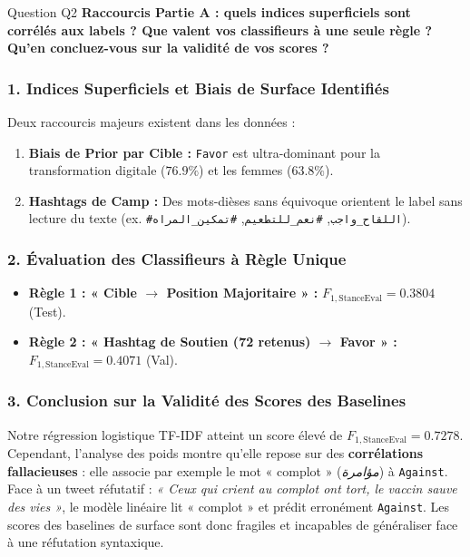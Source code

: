 \documentclass[11pt,a4paper]{article}
\begin{document}
\vspace{0.3cm}

\begin{questionbox}{Question Q2}
\textbf{Raccourcis Partie A : quels indices superficiels sont corrélés aux labels ? Que valent vos classifieurs à une seule règle ? Qu'en concluez-vous sur la validité de vos scores ?}
\end{questionbox}

\subsubsection*{1. Indices Superficiels et Biais de Surface Identifiés}
Deux raccourcis majeurs existent dans les données :
\begin{enumerate}[noitemsep]
    \item \textbf{Biais de Prior par Cible :} \texttt{Favor} est ultra-dominant pour la transformation digitale ($76.9\%$) et les femmes ($63.8\%$).
    \item \textbf{Hashtags de Camp :} Des mots-dièses sans équivoque orientent le label sans lecture du texte (ex. \texttt{\#اللقاح\_واجب}, \texttt{\#نعم\_للتطعيم}, \texttt{\#تمكين\_المراه}).
\end{enumerate}

\subsubsection*{2. Évaluation des Classifieurs à Règle Unique}
\begin{itemize}[noitemsep]
    \item \textbf{Règle 1 : « Cible $\to$ Position Majoritaire » :} $F_{1,\text{StanceEval}} = \mathbf{0.3804}$ (Test).
    \item \textbf{Règle 2 : « Hashtag de Soutien (72 retenus) $\to$ Favor » :} $F_{1,\text{StanceEval}} = \mathbf{0.4071}$ (Val).
\end{itemize}

\subsubsection*{3. Conclusion sur la Validité des Scores des Baselines}
Notre régression logistique TF-IDF atteint un score élevé de $F_{1,\text{StanceEval}} = \mathbf{0.7278}$. Cependant, l'analyse des poids montre qu'elle repose sur des \textbf{corrélations fallacieuses} : elle associe par exemple le mot « complot » (\textit{مؤامرة}) à \texttt{Against}. 
Face à un tweet réfutatif : \textit{« Ceux qui crient au complot ont tort, le vaccin sauve des vies »}, le modèle linéaire lit « complot » et prédit erronément \texttt{Against}. Les scores des baselines de surface sont donc fragiles et incapables de généraliser face à une réfutation syntaxique.
\end{document}
